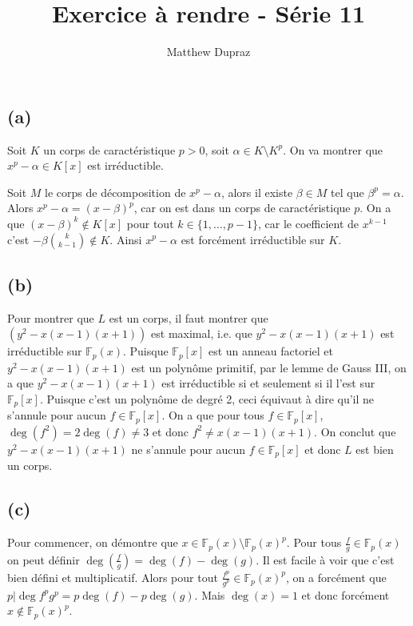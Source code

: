 \documentclass{article}
\author{Matthew Dupraz}
\title{Exercice à rendre - Série 11}
\newcommand{\F}{\mathbb{F}}
\begin{document}
\maketitle

\subsection*{(a)}

Soit $K$ un corps de caractéristique $p > 0$,
soit $\alpha \in K \setminus K^p$. On va montrer que
$x^p - \alpha \in K[x]$ est irréductible.

Soit $M$ le corps de décomposition de $x^p - \alpha$,
alors il existe $\beta \in M$ tel que $\beta^p = \alpha$.
Alors $x^p - \alpha = (x - \beta)^p$, car on est dans un corps de
caractéristique $p$. On a que $(x - \beta)^k \notin K[x]$ pour tout
$k \in \{1, \dots, p-1\}$, car le coefficient de $x^{k-1}$ c'est
$-\beta\binom{k}{k-1} \notin K$. Ainsi $x^p - \alpha$ est
forcément irréductible sur $K$.

\subsection*{(b)}

Pour montrer que $L$ est un corps, il faut montrer que
$(y^2 - x(x-1)(x+1))$ est maximal, i.e. que $y^2 - x(x-1)(x+1)$ est irréductible
sur $\F_p(x)$. Puisque $\F_p[x]$ est un anneau factoriel et
$y^2 - x(x-1)(x+1)$ est un polynôme primitif, par le lemme de Gauss III, 
on a que $y^2 - x(x-1)(x+1)$ est irréductible si et seulement si il l'est
sur $\F_p[x]$. Puisque c'est un polynôme de degré 2, ceci équivaut à dire
qu'il ne s'annule pour aucun $f \in \F_p[x]$.
On a que pour tous $f \in \F_p[x]$,
$\deg(f^2) = 2\deg(f) \neq 3$ et donc $f^2 \neq x(x-1)(x+1)$.
On conclut que $y^2 - x(x-1)(x+1)$ ne s'annule pour aucun $f \in \F_p[x]$ et
donc $L$ est bien un corps.

\subsection*{(c)}

Pour commencer, on démontre que $x \in \F_p(x) \setminus \F_p(x)^p$.
Pour tous $\frac{f}{g} \in \F_p(x)$ on peut définir
$\deg(\frac{f}{g}) = \deg(f) - \deg(g)$. Il est facile à voir que c'est bien
défini et multiplicatif. Alors pour tout $\frac{f^p}{g^p} \in \F_p(x)^p$, 
on a forcément que $p | \deg{f^p}{g^p} = p\deg(f) - p\deg(g)$.
Mais $\deg(x) = 1$ et donc forcément $x \notin \F_p(x)^p$.
\end{document}
